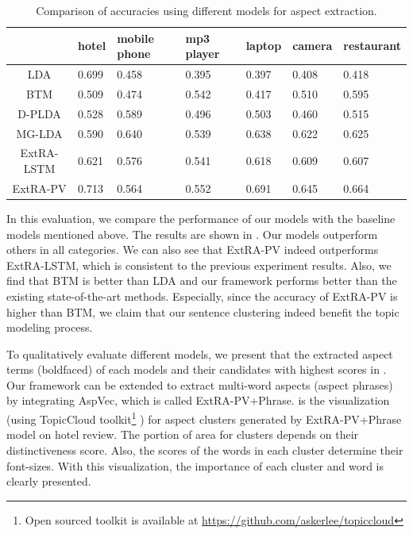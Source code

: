 \begin{table}[t]
	\centering
	\caption{Comparison of  accuracies using different models for aspect extraction.}
	\label{table:comparison}
	\begin{tabular}{|c|C{0.7cm}|C{0.8cm}|C{0.7cm}|C{0.8cm}|C{0.8cm}|C{0.7cm}|}
		\hline
		& hotel & mobile phone & mp3 player & laptop & camera & restaurant  \\ \hline
		LDA & 0.699 & 0.458 & 0.395 & 0.397 & 0.408 &  0.418 \\ \hline
		BTM & 0.509  & 0.474& 0.542 & 0.417 & 0.510 & 0.595 \\ \hline
		D-PLDA & 0.528 & 0.589 & 0.496 & 0.503 & 0.460 & 0.515 \\ \hline
		MG-LDA & 0.590 & 0.640 & 0.539 & 0.638 & 0.622 & 0.625 \\ \hline
		ExtRA-LSTM & 0.621 & 0.576 & 0.541 & 0.618 & 0.609 &  0.607 \\ \hline
		ExtRA-PV & 0.713 & 0.564 & 0.552 & 0.691 & 0.645 & 0.664 \\ \hline
	\end{tabular}
\end{table}


In this evaluation, we compare the performance of our models 
with the baseline models mentioned above. 
The results are shown in . 
Our models outperform others in all categories. 
We can also see that ExtRA-PV indeed outperforms 
ExtRA-LSTM, which is consistent to the previous experiment results.
Also, we find that BTM is better than LDA and our framework performs better than the existing state-of-the-art methods.
Especially, since the accuracy of ExtRA-PV is higher than BTM, we claim that our sentence clustering indeed benefit the topic modeling process. 

To qualitatively evaluate different models,
we present that the extracted aspect terms (boldfaced) of each models and their candidates with highest scores in . 
{Our framework can be extended to extract multi-word aspects (aspect phrases) by integrating AspVec, which is called ExtRA-PV+Phrase.}
 is the visualization (using TopicCloud toolkit\footnote{Open sourced toolkit is available at \url{https://github.com/askerlee/topiccloud}} \cite{li2017document}) for aspect clusters generated by ExtRA-PV+Phrase model on hotel review.
The portion of area for clusters depends on their distinctiveness score.
Also, the scores of the words in each cluster determine their font-sizes.
With this visualization, the importance of each cluster and word is clearly presented.


